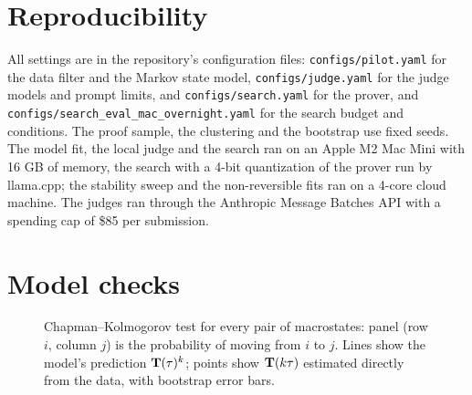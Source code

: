 \section{Reproducibility}
\label{app:repro}

All settings are in the repository's configuration files:
\texttt{configs/pilot.yaml} for the data filter and the Markov state model,
\texttt{configs/judge.yaml} for the judge models and prompt limits, and
\texttt{configs/search.yaml} for the prover, and
\texttt{configs/search\_eval\_mac\_overnight.yaml} for the search budget and
conditions. The proof sample, the clustering and the bootstrap use fixed
seeds. The model fit, the local judge and the search ran on an Apple M2 Mac
Mini with 16 GB of memory, the search with a 4-bit quantization of the prover
run by llama.cpp; the stability sweep and the non-reversible fits ran on a
4-core cloud machine. The judges ran through the
Anthropic Message Batches API with a spending cap of \$85 per submission.

\section{Model checks}
\label{app:checks}

\begin{figure}[t]
  \centering
  \caption{Chapman--Kolmogorov test for every pair of macrostates: panel
  (row $i$, column $j$) is the probability of moving from $i$ to $j$. Lines
  show the model's prediction $\mathbf{T}(\tau)^k$; points show $\mathbf{T}(k\tau)$
  estimated directly from the data, with bootstrap error bars.}
  \label{fig:ck-full}
\end{figure}



